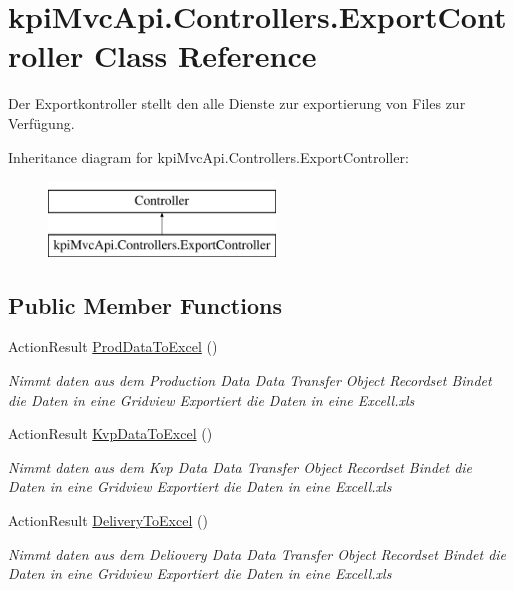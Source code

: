 \hypertarget{classkpi_mvc_api_1_1_controllers_1_1_export_controller}{}\section{kpi\+Mvc\+Api.\+Controllers.\+Export\+Controller Class Reference}
\label{classkpi_mvc_api_1_1_controllers_1_1_export_controller}


Der Exportkontroller stellt den alle Dienste zur exportierung von Files zur Verfügung.  


Inheritance diagram for kpi\+Mvc\+Api.\+Controllers.\+Export\+Controller\+:\begin{figure}[H]
\begin{center}
\leavevmode
\includegraphics[height=2.000000cm]{classkpi_mvc_api_1_1_controllers_1_1_export_controller}
\end{center}
\end{figure}
\subsection*{Public Member Functions}
\begin{DoxyCompactItemize}
\item 
Action\+Result \hyperlink{classkpi_mvc_api_1_1_controllers_1_1_export_controller_a7f779c9cca92a11fd9c37bfef15c0ad4}{Prod\+Data\+To\+Excel} ()
\begin{DoxyCompactList}\small\item\em Nimmt daten aus dem Production Data Data Transfer Object Recordset Bindet die Daten in eine Gridview Exportiert die Daten in eine Excell.\+xls \end{DoxyCompactList}\item 
Action\+Result \hyperlink{classkpi_mvc_api_1_1_controllers_1_1_export_controller_a5350dfcc0605aeb646490cdedd3374bc}{Kvp\+Data\+To\+Excel} ()
\begin{DoxyCompactList}\small\item\em Nimmt daten aus dem Kvp Data Data Transfer Object Recordset Bindet die Daten in eine Gridview Exportiert die Daten in eine Excell.\+xls \end{DoxyCompactList}\item 
Action\+Result \hyperlink{classkpi_mvc_api_1_1_controllers_1_1_export_controller_a5de667891d862c9faa1175625cf563f4}{Delivery\+To\+Excel} ()
\begin{DoxyCompactList}\small\item\em Nimmt daten aus dem Deliovery Data Data Transfer Object Recordset Bindet die Daten in eine Gridview Exportiert die Daten in eine Excell.\+xls \end{DoxyCompactList}\end{DoxyCompactItemize}


